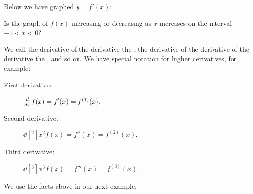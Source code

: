 \documentclass{ximera}
\begin{document}
\begin{question}
  Below we have graphed $y=f'(x)$:
  \begin{image}
  \end{image}
  Is the graph of $f(x)$ increasing or decreasing as $x$ increases on
  the interval $-1<x<0$?
  \begin{prompt}
    \begin{multipleChoice}
    \end{multipleChoice}
  \end{prompt}
\end{question}

We call the derivative of the derivative the , the derivative of the derivative of the derivative the
, and so on. We have special notation for
higher derivatives, for example:
\begin{description}
\item[First derivative:] $\frac{d}{dx} f(x) = f'(x) = f^{(1)}(x)$.
\item[Second derivative:] $\dd[^2]{x^2} f(x) = f''(x) = f^{(2)}(x)$.
\item[Third derivative:] $\dd[^3]{x^3} f(x) = f'''(x) = f^{(3)}(x)$.
\end{description}

We use the facts above in our next example.
\end{document}
